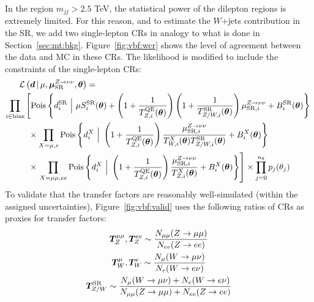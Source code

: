 In the region $m_{jj}>2.5$ TeV, the statistical power of the dilepton regions is extremely limited.
For this reason, and to estimate the $W$+jets contribution in the SR, we add two single-lepton CRs in analogy to what is done in Section~\ref{sec:mt:bkg}. 
Figure~\ref{fig:vbf:wcr} shows the level of agreement between the data and MC in these CRs.
The likelihood is modified to include the constraints of the single-lepton CRs:
\begin{align}
    \mathcal{L}\left(\bm{d}\,|\, \mu,\muz,\bm{\theta}\right) = \hspace{-30mm} & \nonumber \\
    \prod_{i\in\mathrm{bins}} & \left[
    \pois\left\{d^{\mathrm{SR}}_{i} ~\Big|~ \mu S^{\mathrm{SR}}_{i}(\bm\theta)  + \left(1+\frac{1}{\Ti{\mathrm{QE}}{Z}(\bm\theta)}\right)\left(1+\frac{1}{\Ti{\mathrm{SR}}{Z/W}(\bm\theta)}\right)\muzi + B^{\mathrm{SR}}_{i}(\bm\theta)\right\} \vphantom{\frac{\muzi}{\Ti{\mu\mu}{Z}(\bm\theta)}}\right. \nonumber \\
    & \phantom{\Big[} \times \prod_{X=\mu,e} \pois\left\{d^{X}_i~\Big|~ \left(1+\frac{1}{\Ti{\mathrm{QE}}{Z}(\bm\theta)}\right)\frac{\muzi}{\Ti{X}{W}(\bm\theta)\Ti{\mathrm{SR}}{Z/W}(\bm\theta)} + B^{X}_i(\bm\theta) \right\} \nonumber \\
    & \phantom{\Big[} \times \left.\prod_{X=\mu\mu,ee} \pois\left\{d^{X}_i~\Big|~ \left(1+\frac{1}{\Ti{\mathrm{QE}}{Z}(\bm\theta)}\right)\frac{\muzi}{\Ti{X}{Z}(\bm\theta)} + B^{X}_i(\bm\theta) \right\} \right]  \times  \prod_{j=0}^{n_\theta} p_j(\theta_j)
\end{align}
To validate that the transfer factors are reasonably well-simulated (within the assigned uncertainties), Figure~\ref{fig:vbf:valid} uses the following ratios of CRs as proxies for transfer factors:
\begin{gather}
    \bm{T}^{\mu\mu}_{Z}, \bm{T}^{ee}_{Z} \sim \frac{N_{\mu\mu}(Z\rightarrow\mu\mu)}{N_{ee}(Z\rightarrow ee)} \nonumber \\ 
    \bm{T}^{\mu}_{W}, \bm{T}^{e}_{W} \sim \frac{N_\mu(W\rightarrow\mu\nu)}{N_e(W\rightarrow e\nu)} \nonumber \\ 
    \bm{T}^{\mathrm{SR}}_{Z/W} \sim \frac{N_\mu(W\rightarrow\mu\nu)+N_e(W\rightarrow e\nu)}{N_{\mu\mu}(Z\rightarrow\mu\mu)+N_{ee}(Z\rightarrow ee)} 
\end{gather}

